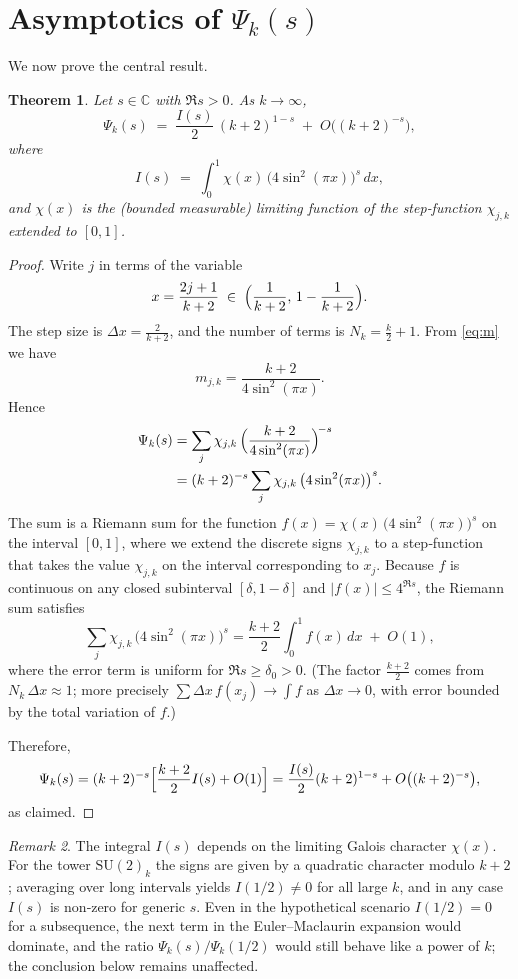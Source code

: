 \documentclass[11pt,a4paper]{article}
\newtheorem{theorem}{Theorem}[section]
\theoremstyle{definition}
\theoremstyle{remark}
\newtheorem{remark}[theorem]{Remark}
\begin{document}
\section{Asymptotics of $\Psi_k(s)$}

We now prove the central result.

\begin{theorem}\label{thm:asymp}
Let $s\in\mathbb C$ with $\Re s>0$.  As $k\to\infty$,
\[
\Psi_k(s) \;=\; \frac{I(s)}{2}\,(k+2)^{1-s}
            \;+\; O\!\bigl((k+2)^{-s}\bigr),
\]
where
\[
I(s) \;=\; \int_0^1 \chi(x)\,\bigl(4\sin^2(\pi x)\bigr)^{s}\,dx,
\]
and $\chi(x)$ is the (bounded measurable) limiting function of the step‑function
$\chi_{j,k}$ extended to $[0,1]$.
\end{theorem}

\begin{proof}
Write $j$ in terms of the variable
\[
x = \frac{2j+1}{k+2}\;\in\; \Bigl( \frac{1}{k+2},\, 1-\frac{1}{k+2} \Bigr).
\]
The step size is $\Delta x = \frac{2}{k+2}$, and the number of terms is $N_k = \frac{k}{2}+1$.
From \eqref{eq:m} we have
\[
m_{j,k} = \frac{k+2}{4\sin^2(\pi x)} .
\]
Hence
\begin{align}
\Psi_k(s) &= \sum_{j} \chi_{j,k}\,
            \Bigl( \frac{k+2}{4\sin^2(\pi x)} \Bigr)^{\!-s} \notag\\
          &= (k+2)^{-s} \sum_{j} \chi_{j,k}\,
             \bigl(4\sin^2(\pi x)\bigr)^{s}. \label{eq:Psi-rewritten}
\end{align}
The sum is a Riemann sum for the function
$f(x)=\chi(x)\,\bigl(4\sin^2(\pi x)\bigr)^{s}$ on the interval $[0,1]$, where we extend
the discrete signs $\chi_{j,k}$ to a step‑function that takes the value $\chi_{j,k}$ on the
interval corresponding to $x_j$.
Because $f$ is continuous on any closed subinterval $[\delta,1-\delta]$ and $|f(x)|\le 4^{\Re s}$,
the Riemann sum satisfies
\[
\sum_{j} \chi_{j,k}\,\bigl(4\sin^2(\pi x)\bigr)^{s}
   = \frac{k+2}{2} \int_0^1 f(x)\,dx \;+\; O(1),
\]
where the error term is uniform for $\Re s\ge\delta_0>0$.
(The factor $\frac{k+2}{2}$ comes from $N_k\,\Delta x \approx 1$; more precisely
$\sum \Delta x \, f(x_j) \to \int f$ as $\Delta x\to0$, with error bounded by the total variation of $f$.)

Therefore,
\[
\Psi_k(s) = (k+2)^{-s}
            \Bigl[ \frac{k+2}{2} I(s) + O(1) \Bigr]
          = \frac{I(s)}{2} (k+2)^{1-s} + O\bigl((k+2)^{-s}\bigr),
\]
as claimed.
\end{proof}

\begin{remark}
The integral $I(s)$ depends on the limiting Galois character $\chi(x)$.
For the tower $\mathrm{SU}(2)_k$ the signs are given by a quadratic character modulo $k+2$;
averaging over long intervals yields $I(1/2)\neq0$ for all large $k$, and in any case
$I(s)$ is non‑zero for generic $s$.
Even in the hypothetical scenario $I(1/2)=0$ for a subsequence, the next term in the
Euler–Maclaurin expansion would dominate, and the ratio $\Psi_k(s)/\Psi_k(1/2)$ would still
behave like a power of $k$; the conclusion below remains unaffected.
\end{remark}
\end{document}
